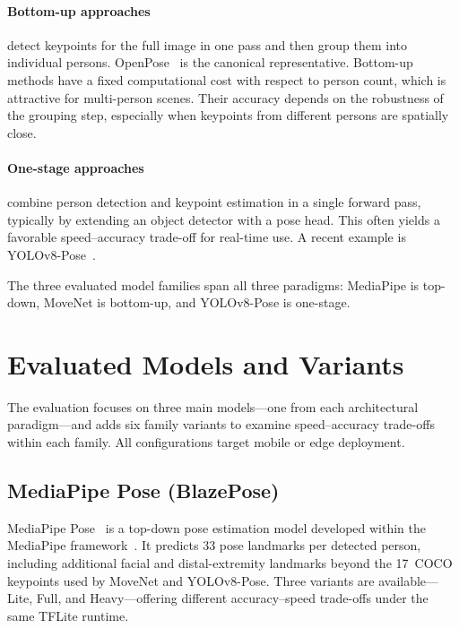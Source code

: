 \paragraph{Bottom-up approaches} detect keypoints for the full image in one pass and then group them into individual persons. OpenPose~\cite{cao2019openpose} is the canonical representative. Bottom-up methods have a fixed computational cost with respect to person count, which is attractive for multi-person scenes. Their accuracy depends on the robustness of the grouping step, especially when keypoints from different persons are spatially close.

\paragraph{One-stage approaches} combine person detection and keypoint estimation in a single forward pass, typically by extending an object detector with a pose head. This often yields a favorable speed--accuracy trade-off for real-time use. A recent example is YOLOv8-Pose~\cite{jocher2023yolov8}.

The three evaluated model families span all three paradigms: MediaPipe is top-down, MoveNet is bottom-up, and YOLOv8-Pose is one-stage.


\section{Evaluated Models and Variants}
\label{sec:models}

The evaluation focuses on three main models---one from each architectural paradigm---and adds six family variants to examine speed--accuracy trade-offs within each family. All configurations target mobile or edge deployment.

\subsection{MediaPipe Pose (BlazePose)}
\label{sec:mediapipe}

MediaPipe Pose~\cite{bazarevsky2020blazepose} is a top-down pose estimation model developed within the MediaPipe framework~\cite{lugaresi2019mediapipe}. It predicts 33 pose landmarks per detected person, including additional facial and distal-extremity landmarks beyond the 17~COCO keypoints used by MoveNet and YOLOv8-Pose. Three variants are available---Lite, Full, and Heavy---offering different accuracy--speed trade-offs under the same TFLite runtime.

